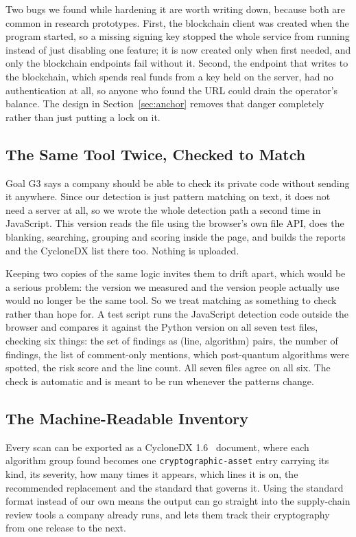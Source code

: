 \documentclass[runningheads]{llncs}
\begin{document}
Two bugs we found while hardening it are worth writing down, because both are
common in research prototypes. First, the blockchain client was created when
the program started, so a missing signing key stopped the whole service from
running instead of just disabling one feature; it is now created only when
first needed, and only the blockchain endpoints fail without it. Second, the
endpoint that writes to the blockchain, which spends real funds from a key held
on the server, had no authentication at all, so anyone who found the URL could
drain the operator's balance. The design in Section~\ref{sec:anchor} removes
that danger completely rather than just putting a lock on it.

\subsection{The Same Tool Twice, Checked to Match}
\label{sec:dualruntime}

Goal G3 says a company should be able to check its private code without sending
it anywhere. Since our detection is just pattern matching on text, it does not
need a server at all, so we wrote the whole detection path a second time in
JavaScript. This version reads the file using the browser's own file API, does
the blanking, searching, grouping and scoring inside the page, and builds the
reports and the CycloneDX list there too. Nothing is uploaded.

Keeping two copies of the same logic invites them to drift apart, which would be
a serious problem: the version we measured and the version people actually use
would no longer be the same tool. So we treat matching as something to check
rather than hope for. A test script runs the JavaScript detection code outside
the browser and compares it against the Python version on all seven test files,
checking six things: the set of findings as (line, algorithm) pairs, the number
of findings, the list of comment-only mentions, which post-quantum algorithms
were spotted, the risk score and the line count. All seven files agree on all
six. The check is automatic and is meant to be run whenever the patterns change.

\subsection{The Machine-Readable Inventory}
\label{sec:cbom}

Every scan can be exported as a CycloneDX 1.6~\cite{cyclonedx} document, where
each algorithm group found becomes one \texttt{cryptographic-asset} entry
carrying its kind, its severity, how many times it appears, which lines it is
on, the recommended replacement and the standard that governs it. Using the
standard format instead of our own means the output can go straight into the
supply-chain review tools a company already runs, and lets them track their
cryptography from one release to the next.
\end{document}

